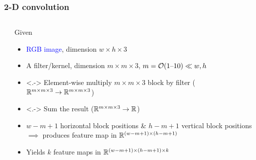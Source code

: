 \begin{frame}
    \frametitle{2-D convolution}
    \begin{columns}
        \begin{column}{0.41\textwidth}
            
        \end{column}
        \begin{column}{0.59\textwidth}
            Given
            \begin{itemize}[<+->]
                \item \textcolor{blue}{RGB image}, dimension $w \times h \times 3$
                \item A \alert{filter}/\alert{kernel}, dimension $m \times m \times 3$, $m = \mathcal{O}(1 \text{--} 10) \ll w, h$
            \end{itemize}
            \begin{itemize}
                \item<.-> Element-wise multiply $m \times m \times 3$ block by filter ($\mathbb{R}^{m \times m \times 3} \to \mathbb{R}^{m \times m \times 3}$)
                \item<.-> Sum the result ($\mathbb{R}^{m \times m \times 3} \to \mathbb{R}$)
                \item<9-> $w - m + 1$ horizontal block positions \& $h - m + 1$ vertical block positions $\implies$ produces \textcolor{Green4}{feature map} in $\mathbb{R}^{(w-m+1) \times (h-m+1)}$
            \end{itemize}
            \begin{itemize}
                \item<10-> Yields $k$ feature maps in $\mathbb{R}^{(w-m+1) \times (h-m+1) \times k}$
            \end{itemize}
        \end{column}
    \end{columns}
\end{frame}

